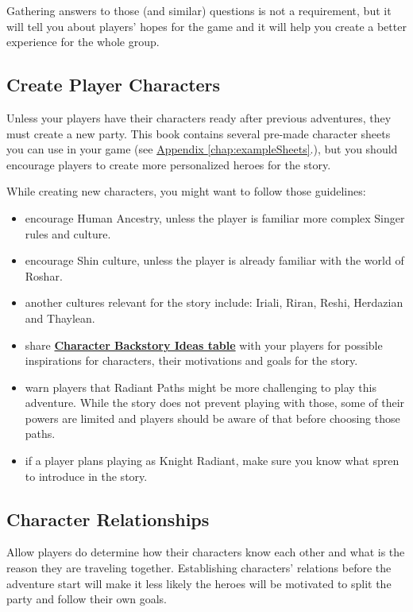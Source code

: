 Gathering answers to those (and similar) questions is not a requirement, but it will tell you about players’ hopes for the game and it will help you create a better experience for the whole group.

\subsection{Create Player Characters}

Unless your players have their characters ready after previous adventures, they must create a new party. This book contains several pre-made character sheets you can use in your game (see \hyperref[chap:exampleSheets]{Appendix \ref{chap:exampleSheets}}.), but you should encourage players to create more personalized heroes for the story.

While creating new characters, you might want to follow those guidelines:
\begin{itemize}
	\item encourage Human Ancestry, unless the player is familiar more complex Singer rules and culture.
	\item encourage Shin culture, unless the player is already familiar with the world of Roshar.
	\item another cultures relevant for the story include: Iriali, Riran, Reshi, Herdazian and Thaylean.
	\item share \hyperref[backstoryIdeas]{\textbf{Character Backstory Ideas table}} with your players for possible inspirations for characters, their motivations and goals for the story.
	\item warn players that Radiant Paths might be more challenging to play this adventure. While the story does not prevent playing with those, some of their powers are limited and players should be aware of that before choosing those paths.
	\item if a player plans playing as Knight Radiant, make sure you know what spren to introduce in the story.
\end{itemize}

\subsection{Character Relationships}

Allow players do determine how their characters know each other and what is the reason they are traveling together. Establishing characters' relations before the adventure start will make it less likely the heroes will be motivated to split the party and follow their own goals.


